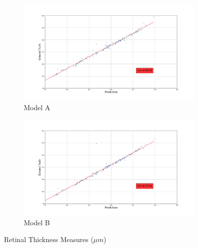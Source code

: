 \documentclass[12pt,a4paper]{scrartcl}
\begin{document}
\begin{figure}[H]
\centering
\begin{subfigure}{1\textwidth}
  \centering
  \includegraphics[width=\linewidth]{./results/model_A_retinal_thickness.png}
  \caption{Model A}
  \label{fig:model_a_specificity}
\end{subfigure}
\begin{subfigure}{1\textwidth}
  \centering
  \includegraphics[width=\linewidth]{./results/model_B_retinal_thickness.png}
  \caption{Model B}
  \label{fig:modelb_specificity}
\end{subfigure}
\caption{Retinal Thickness Measures ($\mu m$)}
\label{fig:specificity_results}
\end{figure}
\end{document}
